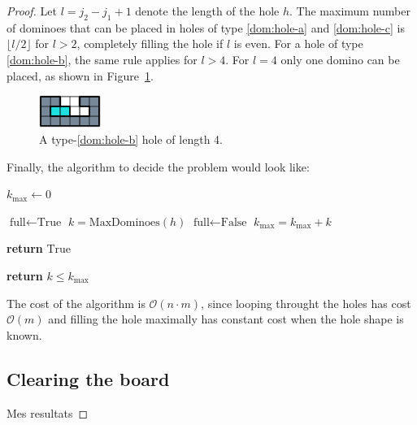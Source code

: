 \begin{proof}
Let \( l = j_2 - j_1 + 1 \) denote the length of the hole \( h \). The maximum number of dominoes that can be placed in holes of type \ref{dom:hole-a} and \ref{dom:hole-c} is \( \lfloor l / 2 \rfloor \) for $l > 2 $, completely filling the hole if \( l \) is even. For a hole of type \ref{dom:hole-b}, the same rule applies for \( l > 4 \). For $l = 4$ only one domino can be placed, as shown in Figure~\ref{dom:hole-4}.

\begin{figure}[h]
    \centering
    \includegraphics[width=0.18\textwidth]{./pictures/dominoes/hole-4.pdf}
    \caption{A type-\ref{dom:hole-b} hole of length 4.}
    \label{dom:hole-4} 
\end{figure}

Finally, the algorithm to decide the problem would look like:
\begin{algorithmic}[1]
     
    \State $k_{\max}\gets 0$ 

    \State $\text{full} \gets \text{True}$
        \State $k = \text{MaxDominoes}(h)$ 
          \State $\text{full} \gets \text{False}$
        \EndIf
        \State $k_{\max} = k_{\max} + k$
      \EndFor

        \State \textbf{return} $\text{True}$ 
    \EndIf
\EndFor

\State \textbf{return} $k \leq k_{\max}$
\EndFunction
\end{algorithmic}

The cost of the algorithm is $\mathcal{O}(n \cdot m)$, since looping throught the holes has cost $\mathcal{O}(m)$ and filling the hole maximally has constant cost when the hole shape is known.

\subsection{Clearing the board}

Mes resultats


\end{proof}


